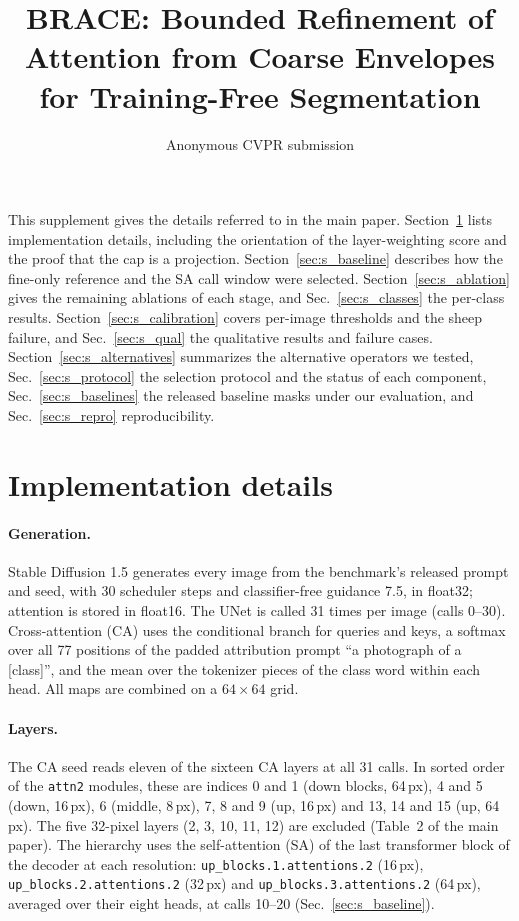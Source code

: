 \documentclass[10pt,twocolumn,letterpaper]{article}
\title{BRACE: Bounded Refinement of Attention from Coarse Envelopes\\for Training-Free Segmentation}
\author{Anonymous CVPR submission}
\begin{document}
\maketitlesupplementary

\noindent This supplement gives the details referred to in the main paper. Section~\ref{sec:s_impl} lists implementation details, including the orientation of the layer-weighting score and the proof that the cap is a projection. Section~\ref{sec:s_baseline} describes how the fine-only reference and the SA call window were selected. Section~\ref{sec:s_ablation} gives the remaining ablations of each stage, and Sec.~\ref{sec:s_classes} the per-class results. Section~\ref{sec:s_calibration} covers per-image thresholds and the sheep failure, and Sec.~\ref{sec:s_qual} the qualitative results and failure cases. Section~\ref{sec:s_alternatives} summarizes the alternative operators we tested, Sec.~\ref{sec:s_protocol} the selection protocol and the status of each component, Sec.~\ref{sec:s_baselines} the released baseline masks under our evaluation, and Sec.~\ref{sec:s_repro} reproducibility.

\section{Implementation details}
\label{sec:s_impl}

\paragraph{Generation.}
Stable Diffusion 1.5 generates every image from the benchmark's released prompt and seed, with 30 scheduler steps and classifier-free guidance 7.5, in float32; attention is stored in float16. The UNet is called 31 times per image (calls 0--30). Cross-attention (CA) uses the conditional branch for queries and keys, a softmax over all 77 positions of the padded attribution prompt ``a photograph of a [class]'', and the mean over the tokenizer pieces of the class word within each head. All maps are combined on a $64\times64$ grid.

\paragraph{Layers.}
The CA seed reads eleven of the sixteen CA layers at all 31 calls. In sorted order of the \texttt{attn2} modules, these are indices 0 and 1 (down blocks, 64\,px), 4 and 5 (down, 16\,px), 6 (middle, 8\,px), 7, 8 and 9 (up, 16\,px) and 13, 14 and 15 (up, 64\,px). The five 32-pixel layers (2, 3, 10, 11, 12) are excluded (Table~2 of the main paper). The hierarchy uses the self-attention (SA) of the last transformer block of the decoder at each resolution: \texttt{up\_blocks.1.attentions.2} (16\,px), \texttt{up\_blocks.2.attentions.2} (32\,px) and \texttt{up\_blocks.3.attentions.2} (64\,px), averaged over their eight heads, at calls 10--20 (Sec.~\ref{sec:s_baseline}).
\end{document}
